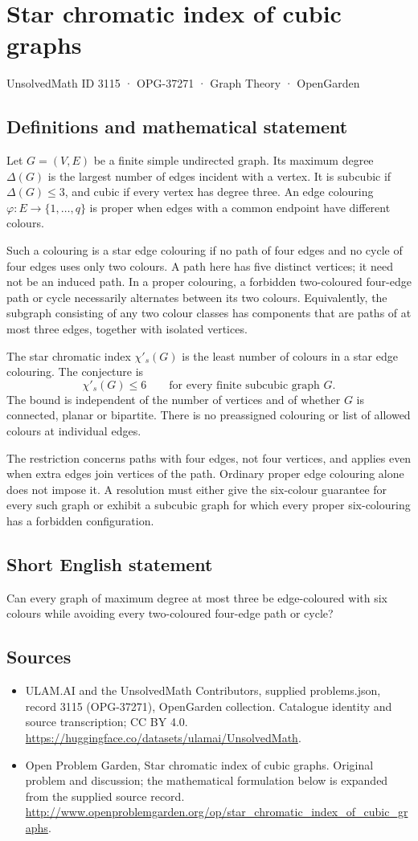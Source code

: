 \documentclass[11pt,a4paper]{article}
\begin{document}
\section*{Star chromatic index of cubic graphs}\label{3115}
{\small UnsolvedMath ID 3115 · OPG-37271 · Graph Theory · OpenGarden}
\subsection{Definitions and mathematical statement}
Let $G=(V,E)$ be a finite simple undirected graph. Its maximum degree
$\Delta(G)$ is the largest number of edges incident with a vertex.
It is subcubic if $\Delta(G)\le3$, and cubic if every vertex has degree
three. An edge colouring $\varphi:E\to\{1,\ldots,q\}$ is proper when
edges with a common endpoint have different colours.

Such a colouring is a star edge colouring if no path of four edges and
no cycle of four edges uses only two colours. A path here has five
distinct vertices; it need not be an induced path. In a proper colouring,
a forbidden two-coloured four-edge path or cycle necessarily alternates
between its two colours. Equivalently, the subgraph consisting of any
two colour classes has components that are paths of at most three edges,
together with isolated vertices.

The star chromatic index $\chi'_s(G)$ is the least number of colours
in a star edge colouring. The conjecture is
\[
 \chi'_s(G)\le6\qquad\text{for every finite subcubic graph }G.
\]
The bound is independent of the number of vertices and of whether $G$
is connected, planar or bipartite. There is no preassigned colouring or
list of allowed colours at individual edges.

The restriction concerns paths with four edges, not four vertices, and
applies even when extra edges join vertices of the path. Ordinary proper
edge colouring alone does not impose it. A resolution must either give
the six-colour guarantee for every such graph or exhibit a subcubic
graph for which every proper six-colouring has a forbidden configuration.
\subsection{Short English statement}
Can every graph of maximum degree at most three be edge-coloured with six colours while avoiding every two-coloured four-edge path or cycle?
\subsection{Sources}
\begin{itemize}
\item[S1] ULAM.AI and the UnsolvedMath Contributors, supplied problems.json, record 3115 (OPG-37271), OpenGarden collection. Catalogue identity and source transcription; CC BY 4.0.
\url{https://huggingface.co/datasets/ulamai/UnsolvedMath}.
\item[S2] Open Problem Garden, Star chromatic index of cubic graphs. Original problem and discussion; the mathematical formulation below is expanded from the supplied source record.
\url{http://www.openproblemgarden.org/op/star_chromatic_index_of_cubic_graphs}.
\end{itemize}
\end{document}
